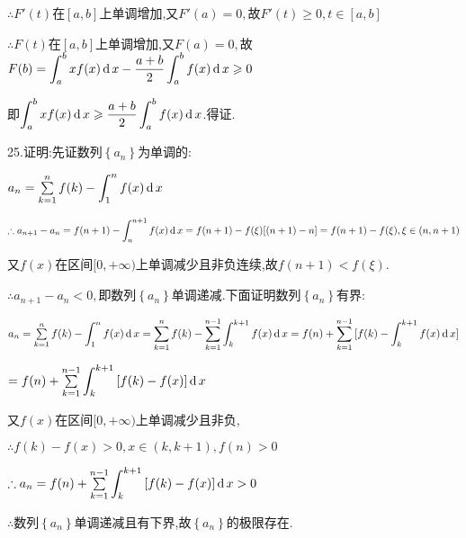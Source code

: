 $\therefore F'(t)$在$[a,b]$上单调增加,又$F'(a) = 0,$故$F'(t) \ge 0,t \in [a,b]$

$\therefore F(t)$在$[a,b]$上单调增加,又$F(a) = 0,$故$F(b) = \displaystyle\int_a^b {xf(x)\operatorname{\mathop{}\!\mathrm{d}} x}  - \dfrac{{a + b}}{2}\displaystyle\int_a^b {f(x)\operatorname{\mathop{}\!\mathrm{d}} x}  \geqslant 0$

即$\displaystyle\int_a^b {xf(x)\operatorname{\mathop{}\!\mathrm{d}} x}  \geqslant \dfrac{{a + b}}{2}\displaystyle\int_a^b {f(x)\operatorname{\mathop{}\!\mathrm{d}} x} $.得证.

25.证明:先证数列$\left\{ {{a_n}} \right\}$为单调的:

${a_n} = \sum\limits_{k = 1}^n {f(k)}  - \displaystyle\int_1^n {f(x)\operatorname{\mathop{}\!\mathrm{d}} x} $

$\therefore {a_{n + 1}} - {a_n} = f(n + 1) - \displaystyle\int_n^{n + 1} {f(x)\operatorname{\mathop{}\!\mathrm{d}} x}  = f(n + 1) - f(\xi )[(n + 1) - n] = f(n + 1) - f(\xi ),\xi  \in (n,n + 1)$

又$f(x)$在区间$[0, + \infty )$上单调减少且非负连续,故$f(n + 1) < f(\xi ).$

$\therefore {a_{n + 1}} - {a_n} < 0,$即数列$\left\{ {{a_n}} \right\}$单调递减.下面证明数列$\left\{ {{a_n}} \right\}$有界:

${a_n} = \sum\limits_{k = 1}^n {f(k)}  - \displaystyle\int_1^n {f(x)\operatorname{\mathop{}\!\mathrm{d}} x}  = \sum\limits_{k = 1}^n {f(k)}  - \sum\limits_{k = 1}^{n - 1} {\displaystyle\int_k^{k + 1} {f(x)\operatorname{\mathop{}\!\mathrm{d}} x} }  = f(n) + \sum\limits_{k = 1}^{n - 1} {[f(k) - \displaystyle\int_k^{k + 1} {f(x)\operatorname{\mathop{}\!\mathrm{d}} x} ]} $

$ = f(n) + \sum\limits_{k = 1}^{n - 1} {\displaystyle\int_k^{k + 1} {[f(k) - f(x)]\operatorname{\mathop{}\!\mathrm{d}} x} } $

又$f(x)$在区间$[0, + \infty )$上单调减少且非负,

$\therefore f(k) - f(x) > 0,x \in (k,k + 1),f(n) > 0$

$\therefore {a_n} = f(n) + \sum\limits_{k = 1}^{n - 1} {\displaystyle\int_k^{k + 1} {[f(k) - f(x)]\operatorname{\mathop{}\!\mathrm{d}} x} }  > 0$

$\therefore$数列$\left\{ {{a_n}} \right\}$单调递减且有下界,故$\left\{ {{a_n}} \right\}$的极限存在.






































